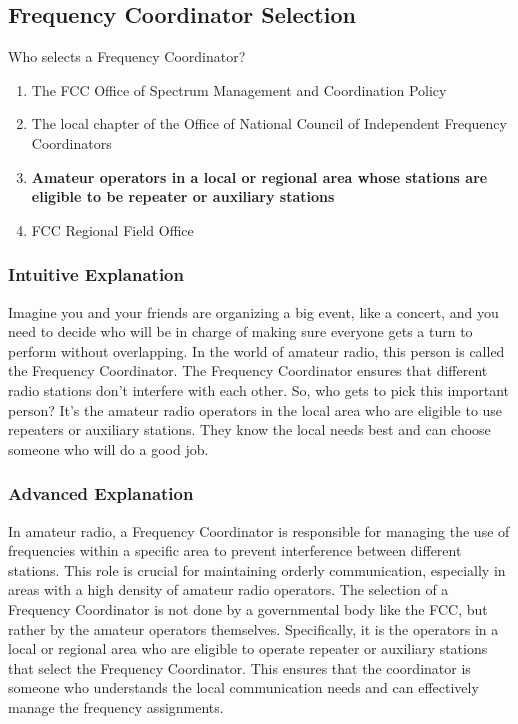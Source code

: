 \subsection{Frequency Coordinator Selection}
\label{T1A09}

\begin{tcolorbox}[colback=gray!10!white,colframe=black!75!black,title=T1A09]
Who selects a Frequency Coordinator?
\begin{enumerate}[label=\Alph*),noitemsep]
    \item The FCC Office of Spectrum Management and Coordination Policy
    \item The local chapter of the Office of National Council of Independent Frequency Coordinators
    \item \textbf{Amateur operators in a local or regional area whose stations are eligible to be repeater or auxiliary stations}
    \item FCC Regional Field Office
\end{enumerate}
\end{tcolorbox}

\subsubsection*{Intuitive Explanation}
Imagine you and your friends are organizing a big event, like a concert, and you need to decide who will be in charge of making sure everyone gets a turn to perform without overlapping. In the world of amateur radio, this person is called the Frequency Coordinator. The Frequency Coordinator ensures that different radio stations don't interfere with each other. So, who gets to pick this important person? It's the amateur radio operators in the local area who are eligible to use repeaters or auxiliary stations. They know the local needs best and can choose someone who will do a good job.

\subsubsection*{Advanced Explanation}
In amateur radio, a Frequency Coordinator is responsible for managing the use of frequencies within a specific area to prevent interference between different stations. This role is crucial for maintaining orderly communication, especially in areas with a high density of amateur radio operators. The selection of a Frequency Coordinator is not done by a governmental body like the FCC, but rather by the amateur operators themselves. Specifically, it is the operators in a local or regional area who are eligible to operate repeater or auxiliary stations that select the Frequency Coordinator. This ensures that the coordinator is someone who understands the local communication needs and can effectively manage the frequency assignments.
